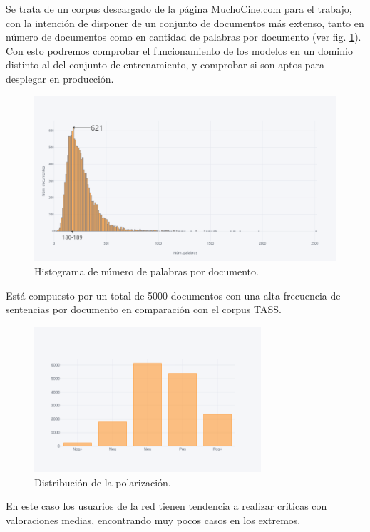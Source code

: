 Se trata de un corpus descargado de la página MuchoCine.com para el trabajo, con la intención de disponer de un conjunto de documentos más extenso, tanto en número de documentos como en cantidad de palabras por documento (ver fig. \ref{dist_tokes_pelis}). 
Con esto podremos comprobar el funcionamiento de los modelos en un dominio distinto al del conjunto de entrenamiento, y comprobar si son aptos para desplegar en producción.

\begin{figure}[!ht]
	\centering
	\includegraphics[width=1\textwidth]{imaxes/distTokensCine.png}
	\caption{Histograma de número de palabras por documento.}
	\label{dist_tokes_pelis}
\end{figure}

Está compuesto por un total de 5000 documentos con una alta frecuencia de sentencias por documento en comparación con el corpus TASS.

\begin{figure}[!ht]
	\centering
	\includegraphics[width=0.75\textwidth]{imaxes/distCine.png}
	\caption{Distribución de la polarización.}
	\label{dist_pos_pelis}
\end{figure}

En este caso los usuarios de la red tienen tendencia a realizar críticas con valoraciones medias, encontrando muy pocos casos en los extremos.


